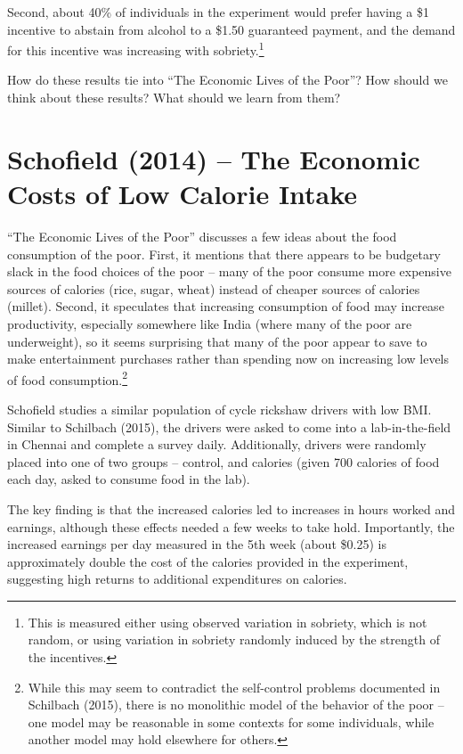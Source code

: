 \documentclass[12pt,english]{article}
\begin{document}
Second, about 40\% of individuals in the experiment would prefer having a \$1 incentive to abstain from alcohol to a \$1.50 guaranteed payment, and the demand for this incentive was increasing with sobriety.\footnote{This is measured either using observed variation in sobriety, which is not random, or using variation in sobriety randomly induced by the strength of the incentives.}

How do these results tie into ``The Economic Lives of the Poor''? How should we think about these results? What should we learn from them?

\section{Schofield (2014) -- The Economic Costs of Low Calorie Intake}

``The Economic Lives of the Poor'' discusses a few ideas about the food consumption of the poor. First, it mentions that there appears to be budgetary slack in the food choices of the poor -- many of the poor consume more expensive sources of calories (rice, sugar, wheat) instead of cheaper sources of calories (millet). Second, it speculates that increasing consumption of food may increase productivity, especially somewhere like India (where many of the poor are underweight), so it seems surprising that many of the poor appear to save to make entertainment purchases rather than spending now on increasing low levels of food consumption.\footnote{While this may seem to contradict the self-control problems documented in Schilbach (2015), there is no monolithic model of the behavior of the poor -- one model may be reasonable in some contexts for some individuals, while another model may hold elsewhere for others.}

Schofield studies a similar population of cycle rickshaw drivers with low BMI. Similar to Schilbach (2015), the drivers were asked to come into a lab-in-the-field in Chennai and complete a survey daily. Additionally, drivers were randomly placed into one of two groups -- control, and calories (given 700 calories of food each day, asked to consume food in the lab).

The key finding is that the increased calories led to increases in hours worked and earnings, although these effects needed a few weeks to take hold. Importantly, the increased earnings per day measured in the 5th week (about \$0.25) is approximately double the cost of the calories provided in the experiment, suggesting high returns to additional expenditures on calories.
\end{document}
